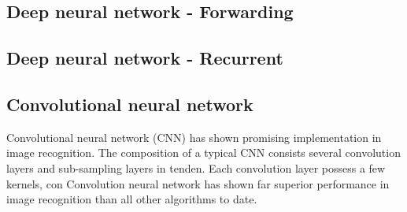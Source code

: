 \subsection{Deep neural network - Forwarding}
\subsection{Deep neural network - Recurrent}
\subsection{Convolutional neural network}
Convolutional neural network (CNN) has shown promising implementation in image recognition. The composition of a typical CNN consists several convolution layers and sub-sampling layers in tenden. Each convolution layer possess a few kernels, con
Convolution neural network has shown far superior performance in image recognition than all other algorithms to date.~\cite{Szegedy_2015}